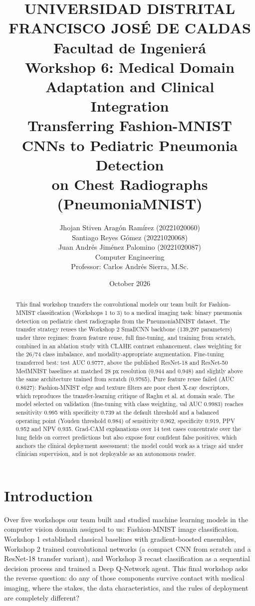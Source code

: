 \documentclass[11pt,a4paper]{article}
\title{\vspace{-1.5cm}UNIVERSIDAD DISTRITAL FRANCISCO JOS\'E DE CALDAS\\[2mm]
\large Facultad de Ingenier\'a\\[10mm]
\Large Workshop 6: Medical Domain Adaptation and Clinical Integration\\[2mm]
\large Transferring Fashion-MNIST CNNs to Pediatric Pneumonia Detection\\ on Chest Radiographs (PneumoniaMNIST)}
\author{Jhojan Stiven Arag\'on Ram\'irez (20221020060)\\
Santiago Reyes G\'omez (20221020068)\\
Juan Andr\'es Jim\'enez Palomino (20221020087)\\[4mm]
\normalsize Computer Engineering\\
Professor: Carlos Andr\'es Sierra, M.Sc.}
\date{October 2026}
\begin{document}
\maketitle

\begin{abstract}
This final workshop transfers the convolutional models our team built for Fashion-MNIST classification (Workshops 1 to 3) to a medical imaging task: binary pneumonia detection on pediatric chest radiographs from the PneumoniaMNIST dataset. The transfer strategy reuses the Workshop 2 SmallCNN backbone (139{,}297 parameters) under three regimes: frozen feature reuse, full fine-tuning, and training from scratch, combined in an ablation study with CLAHE contrast enhancement, class weighting for the 26/74 class imbalance, and modality-appropriate augmentation. Fine-tuning transferred best: test AUC 0.9777, above the published ResNet-18 and ResNet-50 MedMNIST baselines at matched 28 px resolution (0.944 and 0.948) and slightly above the same architecture trained from scratch (0.9765). Pure feature reuse failed (AUC 0.8627): Fashion-MNIST edge and texture filters are poor chest X-ray descriptors, which reproduces the transfer-learning critique of Raghu et al. at domain scale. The model selected on validation (fine-tuning with class weighting, val AUC 0.9983) reaches sensitivity 0.995 with specificity 0.739 at the default threshold and a balanced operating point (Youden threshold 0.984) of sensitivity 0.962, specificity 0.919, PPV 0.952 and NPV 0.935. Grad-CAM explanations over 14 test cases concentrate over the lung fields on correct predictions but also expose four confident false positives, which anchors the clinical deployment assessment: the model could work as a triage aid under clinician supervision, and is not deployable as an autonomous reader.
\end{abstract}

\tableofcontents
\newpage

\section{Introduction}

Over five workshops our team built and studied machine learning models in the computer vision domain assigned to us: Fashion-MNIST image classification. Workshop 1 established classical baselines with gradient-boosted ensembles, Workshop 2 trained convolutional networks (a compact CNN from scratch and a ResNet-18 transfer variant), and Workshop 3 recast classification as a sequential decision process and trained a Deep Q-Network agent. This final workshop asks the reverse question: do any of those components survive contact with medical imaging, where the stakes, the data characteristics, and the rules of deployment are completely different?
\end{document}
